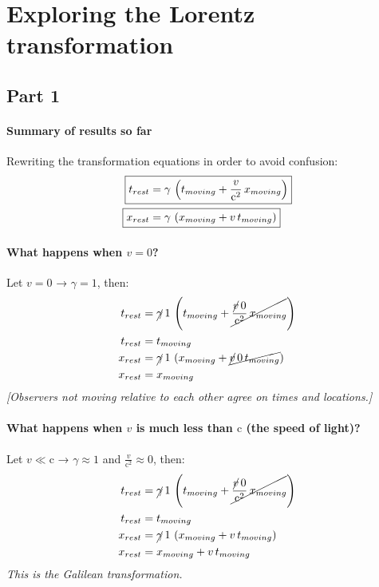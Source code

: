\documentclass[pagesize,headsepline,10pt,parskip=half]{scrreprt}
\newcommand{\const}[1]{\ensuremath{\mathrm{#1}}}
\renewcommand{\c}{\const{c}}
\begin{document}
    \section{Exploring the Lorentz transformation}
      \subsection{Part 1}
        \paragraph{Summary of results so far}
          Rewriting the transformation equations in order to avoid confusion:
          \begin{align*}
            \Aboxed{t_{rest} &= \gamma \, \left(t_{moving} + \frac{v}{\c^2} \, x_{moving}\right)}\\
            \Aboxed{x_{rest} &= \gamma \, \left(x_{moving} + v \, t_{moving}\right)}
          \end{align*}

        \paragraph{What happens when $v = 0$?}
          \begin{samepage}
            Let $v = 0$ → $\gamma = 1$, then:
            \begin{align*}
              t_{rest} &= \cancel{\gamma} \, 1 \, \left(t_{moving} + \cancel{\frac{\cancel{v} \, 0}{\c^2} \, x_{moving}}\right)\\
              t_{rest} &= t_{moving}\\
              x_{rest} &= \cancel{\gamma} \, 1 \, \left(x_{moving} + \cancel{\cancel{v} \,  0 \, t_{moving}}\right)\\
              x_{rest} &= x_{moving}
            \end{align*}
            \emph{[Observers not moving relative to each other agree on times and locations.]}
          \end{samepage}
        \paragraph{What happens when $v$ is much less than \c{} (the speed of light)?}
          Let $v \ll \c$ → $\gamma \approx 1$ and $\frac{v}{\c^2} \approx 0$, then:
          \begin{align*}
            t_{rest} &= \cancel{\gamma} \, 1 \, \left(t_{moving} + \cancel{\frac{\cancel{v} \, 0}{\c^2} \, x_{moving}}\right)\\
            t_{rest} &= t_{moving}\\
            x_{rest} &= \cancel{\gamma} \, 1 \, \left(x_{moving} + v \, t_{moving}\right)\\
            x_{rest} &= x_{moving} + v \, t_{moving}
          \end{align*}
          \emph{This is the Galilean transformation.}
\end{document}
